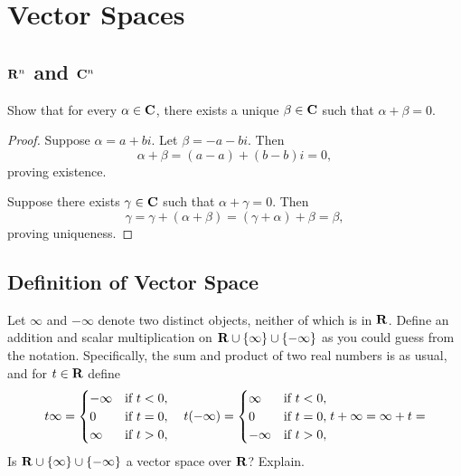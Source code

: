 \chapter{Vector Spaces}


\section{\texorpdfstring{$\mathbf{R}^{n}$}{R\^{}n} and \texorpdfstring{$\mathbf{C}^{n}$}{C\^{}n}}

\begin{exercise}{7}
	Show that for every \( \alpha \in \mathbf{C} \), there exists a unique \( \beta \in \mathbf{C} \)
	such that \( \alpha + \beta = 0 \).
\end{exercise}

\begin{proof}
	Suppose \( \alpha = a + bi \). Let \( \beta = -a - bi \). Then
	\[
		\alpha + \beta = (a - a) + (b - b)i = 0,
	\]
	proving existence.

	Suppose there exists \( \gamma \in \mathbf{C} \) such that \( \alpha + \gamma = 0 \). Then
	\[
		\gamma = \gamma + (\alpha + \beta) = (\gamma + \alpha) + \beta = \beta,
	\]
	proving uniqueness.
\end{proof}



\section{Definition of Vector Space}

\begin{exercise}{6}
	Let \( \infty \) and \( -\infty \) denote two distinct objects, neither of
	which is in \( \mathbf{R} \). Define an addition and scalar multiplication on
	\( \mathbf{R} \cup \{\infty\} \cup \{-\infty\} \) as you could guess from the notation.
	Specifically, the sum and product of two real numbers is as usual, and for
	\( t \in \mathbf{R} \) define
	\[
		t\infty = \begin{cases}
			-\infty & \text{if} \ t < 0, \\
			0       & \text{if} \ t = 0, \\
			\infty  & \text{if} \ t > 0,
		\end{cases} \quad
		t(-\infty) = \begin{cases}
			\infty  & \text{if} \ t < 0, \\
			0       & \text{if} \ t = 0, \\
			-\infty & \text{if} \ t > 0,
		\end{cases} \\
		t + \infty = \infty + t = 
	\]
	Is \( \mathbf{R} \cup \{\infty\} \cup \{-\infty\} \) a vector space over \( \mathbf{R} \)? Explain.
\end{exercise}

